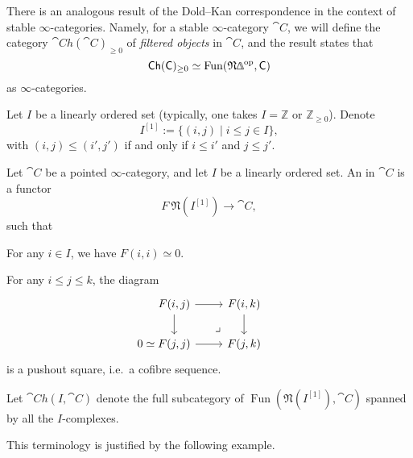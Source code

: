 There is an analogous result of the Dold--Kan correspondence
in the context of stable $\infty$-categories.
Namely, for a stable $\infty$-category $\cat{C}$,
we will define the category $\cat{Ch}(\cat{C})_{\geq0}$ of \emph{filtered objects}
in $\cat{C}$, and the result states that
\[ \cat{Ch}(\cat{C})_{\geq0}\simeq\operatorname{Fun}(\mathfrak N\bfDelta\op,\cat{C}) \]
as $\infty$-categories.

Let $I$ be a linearly ordered set (typically, one takes
$I=\mathbb Z$ or $\mathbb Z_{\geq0}$). Denote
\[I^{[1]}:=\{(i,j)\mid i\leq j\in I\},\] 
with $(i,j)\leq(i',j')$ if and only if $i\leq i'$ and $j\leq j'$.

\begin{definition}
    Let $\cat{C}$ be a pointed $\infty$-category,
    and let $I$ be a linearly ordered set.
    An  in $\cat{C}$ is a functor 
    \[F\:\mathfrak{N}(I^{[1]})\to\cat{C},\]
    such that 
    \begin{itms}
        \item For any $i\in I$, we have $F(i,i)\simeq0$.
        \item For any $i\leq j\leq k$, the diagram 
        \[\begin{tikzcd}
            F(i,j)\ar[r]\ar[d]\ar[dr,phantom,pos=.75,"\lrcorner"] & F(i,k)\ar[d] \\
            \llap{$0\simeq{}$}F(j,j)\ar[r] & F(j,k)
        \end{tikzcd}\]
        is a pushout square, i.e.\ a cofibre sequence.
    \end{itms}
    Let $\cat{Ch}(I,\cat{C})$ denote the full subcategory of
    $\operatorname{Fun}(\mathfrak N(I^{[1]}),\cat{C})$
    spanned by all the $I$-complexes.
\end{definition}

This terminology is justified by the following example.

